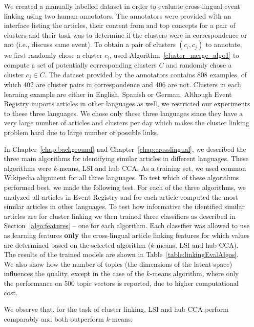 We created a manually labelled dataset in order to evaluate cross-lingual event
linking using two human annotators. The annotators were provided with an interface
listing the articles, their content from and top concepts for a pair of clusters and
their task was to determine if the clusters were in correspondence or not (i.e., discuss same event).
To obtain a pair of clusters $(c_i, c_j)$ to annotate, we first randomly chose a
cluster $c_i$, used Algorithm~\ref{cluster_merge_algo1} to compute a set of potentially
corresponding clusters $C$ and randomly chose a cluster $c_j \in C$. The dataset provided
by the annotators contains 808 examples, of which 402 are cluster pairs in correspondence and
406 are not. Clusters in each learning example are either in English, Spanish or German.
Although Event Registry imports articles in other languages as well, we restricted our
experiments to these three languages. We chose only these three languages since they
have a very large number of articles and clusters per day which makes the cluster linking
problem hard due to large number of possible links.

In Chapter~\ref{chap:background} and Chapter~\ref{chap:crosslingual}, we described the
three main algorithms for identifying similar articles in different languages.
These algorithms were $k$-means, LSI and hub CCA. As a training set, we used common
Wikipedia alignment for all three languages. To test
which of these algorithms performed best, we made the following test. For each of the three
algorithms, we analyzed all articles in Event Registry and for each article computed the
most similar articles in other languages. To test how informative the identified similar
articles are for cluster linking we then trained three classifiers as described in
Section~\ref{algo:features} -- one for each algorithm. Each classifier was allowed
to use as learning features \textbf{only} the cross-lingual article linking features
for which values are determined based on the selected algorithm ($k$-means, LSI and hub CCA).
The results of the trained models are shown in Table~\ref{table:linkingEvalAlgos}. We also show
how the number of topics (the dimensions of the latent space) influences the quality,
except in the case of the $k$-means algorithm, where only the performance on 500 topic
vectors is reported, due to higher computational cost.

We observe that, for the task of cluster linking, LSI and hub CCA perform comparably and both outperform $k$-means.

